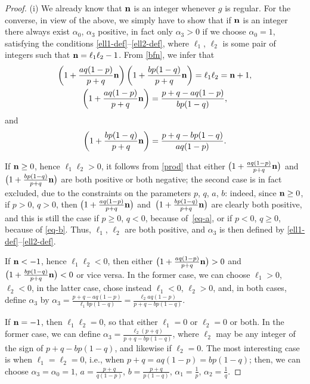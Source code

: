 \documentclass[10pt,a4paper]{amsart}
\numberwithin{equation}{section}
\begin{document}
\begin{proof} (i) We already know that ${\bf n}$ is an integer whenever $g$ is regular. For the converse, in view of the above, we simply have to show that if ${\bf n}$ is an integer there always exist $\alpha _0$, $\alpha _3$ positive, in fact only $\alpha _3 > 0$ if we choose $\alpha _0 = 1$, satisfying the conditions \eqref{ell1-def}--\eqref{ell2-def}, where $\ell _1$, $\ell _2$ is some pair of integers such that ${\bf n} = \ell _1 \ell _2 - 1$. From \eqref{bfn}, we infer that
\begin{gather} \left(1 + \frac{a q (1 - p)}{p + q} {\bf n}\right) \left(1 + \frac{b p (1 - q)}{p + q} {\bf n}\right) = \ell _1 \ell _2 = {\bf n} + 1, \label{prod}\\
 \left(1 + \frac{a q (1 - p)}{p + q} {\bf n}\right) = \frac{p + q - a q (1 - p)}{b p (1 - q)}, \label{eq-a} \end{gather}
and
\begin{gather} \label{eq-b} \left(1 + \frac{b p (1 - q)}{p + q} {\bf n}\right) = \frac{p + q - b p (1 - q)}{a q (1 - p)}. \end{gather}


If ${\bf n} \geq 0$, hence $\ell _1 \ell _2 > 0$, it follows from \eqref{prod} that either $\big(1 + \frac{a q (1 - p)}{p + q} {\bf n}\big)$ and $\big(1 + \frac{b p (1 - q)}{p + q} {\bf n}\big)$ are both positive or both negative; the second case is in fact excluded, due to the constraints on the parameters $p$, $q$, $a$, $b$: indeed, since ${\bf n} \geq 0$, if $p >0$, $q >0$, then $\big(1 + \frac{a q (1 - p)}{p + q} {\bf n}\big)$ and~$\big(1 + \frac{b p (1 - q)}{p + q} {\bf n}\big)$ are clearly both positive, and this is still the case if $p \geq 0$, $q < 0$, because of~\eqref{eq-a}, or if $p < 0$, $q \geq 0$, because of \eqref{eq-b}. Thus, $\ell _1$, $\ell _2$ are both positive, and $\alpha _3$ is then defined by \eqref{ell1-def}--\eqref{ell2-def}.


If ${\bf n} < - 1$, hence $\ell _1 \ell _2 < 0$, then either $\big(1 + \frac{a q (1 - p)}{p + q} {\bf n}\big) > 0$ and $\big(1 + \frac{b p (1 - q)}{p + q} {\bf n}\big) < 0$ or vice versa. In the former case, we can choose $\ell _1 > 0$, $\ell _2 < 0$, in the latter case, chose instead $\ell _1 < 0$, $\ell _2 > 0$, and, in both cases, define $\alpha _3$ by $\alpha _3 = \frac{p + q - a q (1 - p)}{\ell _1 b p (1 - q)} = \frac{\ell _2 a q (1 - p)}{p + q - b p (1 - q)}$.


If ${\bf n} = - 1$, then $\ell _1 \ell _2 = 0$, so that either $\ell _1 = 0$ or $\ell _2 = 0$ or both. In the former case, we can define $\alpha _3 = \frac{\ell _2 (p + q)}{p + q - b p (1 - q)}$, where $\ell _2$ may be any integer of the sign of $p + q - b p (1 - q)$, and likewise if $\ell _2 = 0$. The most interesting case is when $\ell _1 = \ell _2 = 0$, i.e., when $p + q = a q (1 - p) = b p (1 - q)$; then, we can choose $\alpha _3 = \alpha _0 = 1$, $a = \frac{p + q}{q (1 - p)}$, $b = \frac{p + q}{p (1 - q)}$, $\alpha _1 = \frac{1}{p}$, $\alpha _2 = \frac{1}{q}$.


\end{proof}
\end{document}
